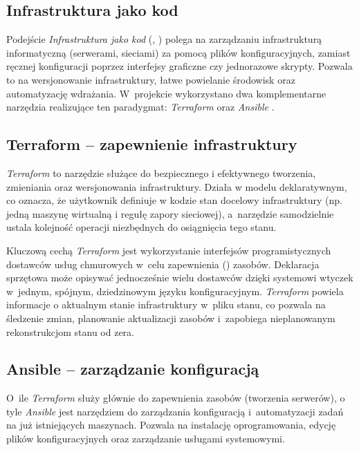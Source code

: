 \subsection{Infrastruktura jako kod}

Podejście \textit{Infrastruktura jako kod} (, ) \cite{iac} polega na zarządzaniu infrastrukturą informatyczną (serwerami, sieciami) za pomocą plików konfiguracyjnych, zamiast ręcznej konfiguracji poprzez interfejsy graficzne czy jednorazowe skrypty. Pozwala to na wersjonowanie infrastruktury, łatwe powielanie środowisk oraz automatyzację wdrażania. W~projekcie wykorzystano dwa komplementarne narzędzia realizujące ten paradygmat: \textit{Terraform} \cite{terraform} oraz \textit{Ansible} \cite{ansible}.

\subsection{Terraform -- zapewnienie infrastruktury}

\textit{Terraform} to narzędzie służące do bezpiecznego i efektywnego tworzenia, zmieniania oraz wersjonowania infrastruktury. Działa w modelu deklaratywnym, co oznacza, że użytkownik definiuje w kodzie stan docelowy infrastruktury (np. jedną maszynę wirtualną i regułę zapory sieciowej), a~narzędzie samodzielnie ustala kolejność operacji niezbędnych do osiągnięcia tego stanu.

Kluczową cechą \textit{Terraform} jest wykorzystanie interfejsów programistycznych dostawców usług chmurowych w~celu zapewnienia () zasobów. Deklaracja sprzętowa może opisywać jednocześnie wielu dostawców dzięki systemowi wtyczek w~jednym, spójnym, dziedzinowym języku konfiguracyjnym. \textit{Terraform} powiela informacje o aktualnym stanie infrastruktury w~pliku stanu, co pozwala na śledzenie zmian, planowanie aktualizacji zasobów i~zapobiega nieplanowanym rekonstrukcjom stanu od zera.

\subsection{Ansible -- zarządzanie konfiguracją}

O~ile \textit{Terraform} służy głównie do zapewnienia zasobów (tworzenia serwerów), o tyle \textit{Ansible} jest narzędziem do zarządzania konfiguracją i~automatyzacji zadań na już istniejących maszynach. Pozwala na instalację oprogramowania, edycję plików konfiguracyjnych oraz zarządzanie usługami systemowymi.

